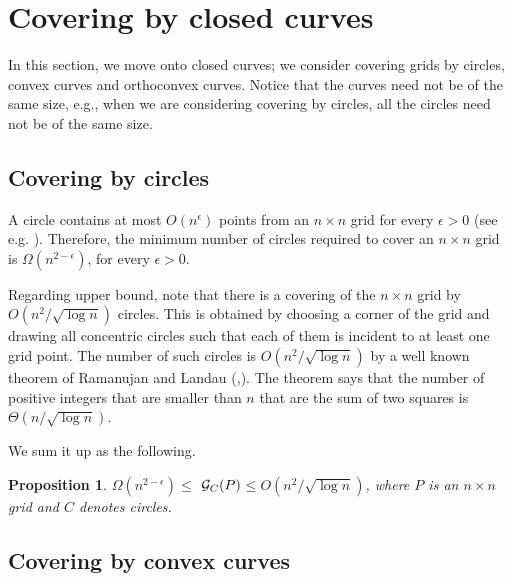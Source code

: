 \documentclass[
final
]{dmtcs-episciences}
\numberwithin{equation}{subsection}
\newtheorem{prop}[defn]{Proposition}%
\newcommand{\ga}{${\cal G}_C(P)$}
\begin{document}
\section{Covering by closed curves}\label{sec:closedcurve}
\noindent
In this section, we move onto closed curves; we consider covering grids by circles, convex curves and orthoconvex curves. Notice that the curves need not be of the same size, e.g., when we are considering covering by circles, all the circles need not be of the same size.
\subsection{Covering by circles} 
A circle contains at most $O(n^{\epsilon})$ points from an $n\times n$ grid for every $\epsilon >0$ (see e.g. \cite {guth}). Therefore, the minimum number of circles required to cover an $n \times n$ grid is $\Omega (n^{2-\epsilon})$, for every $\epsilon >0$.

\medskip	

Regarding upper bound, note that there is a covering of the $n\times n$ grid by $O(n^2/\sqrt{\log n})$ circles. This is obtained by choosing a corner of the grid and drawing all concentric circles such that each of them is incident to at least one grid point. The number of such circles is $O(n^2/\sqrt{\log n})$ by a well known theorem of Ramanujan and Landau (\cite{ramanujan},\cite{landau}). The theorem says that the number of positive integers that are smaller than $n$ that are the sum of two squares is $\Theta (n/\sqrt{\log n})$.

\medskip

We sum it up as the following.

\begin{prop}
	$\Omega (n^{2-\epsilon}) \leq $ \ga $ \leq O(n^2/\sqrt{\log n})$, where $P$ is an $n\times n$ grid and $C$ denotes circles.
\end{prop}

\subsection{Covering by convex curves}
\end{document}
